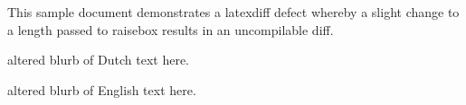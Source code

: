 \documentclass{minimal}
\begin{document}
This sample document demonstrates a latexdiff defect whereby
a slight change to a length passed to raisebox results in an uncompilable diff.\\

\noindent\begin{minipage}[b]{0.32\textwidth}%
  altered blurb of Dutch text here.%
\end{minipage}\hfill%
\hfill%
\noindent\begin{minipage}[b]{0.28\textwidth}%
   altered blurb of English text here.%
\end{minipage}%
\end{document}
